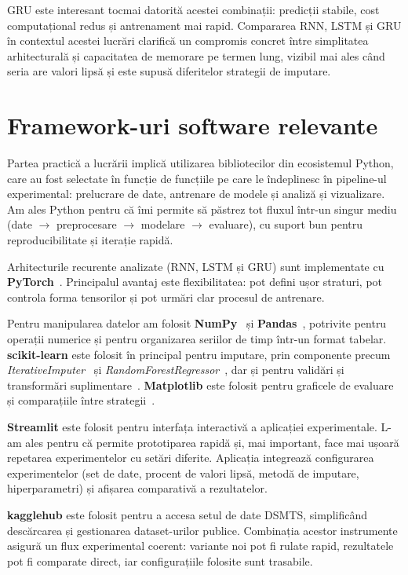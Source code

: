 GRU este interesant tocmai datorită acestei combinații: predicții stabile, cost computațional redus și antrenament mai rapid. Compararea RNN, LSTM și GRU în contextul acestei lucrări clarifică un compromis concret între simplitatea arhitecturală și capacitatea de memorare pe termen lung, vizibil mai ales când seria are valori lipsă și este supusă diferitelor strategii de imputare.

\newpage
\section{Framework-uri software relevante}

Partea practică a lucrării implică utilizarea bibliotecilor din ecosistemul Python, care au fost selectate în funcție de funcțiile pe care le îndeplinesc în pipeline-ul experimental: prelucrare de date, antrenare de modele și analiză și vizualizare. Am ales Python pentru că îmi permite să păstrez tot fluxul într-un singur mediu (date $\rightarrow$ preprocesare $\rightarrow$ modelare $\rightarrow$ evaluare), cu suport bun pentru reproducibilitate și iterație rapidă.

Arhitecturile recurente analizate (RNN, LSTM și GRU) sunt implementate cu \textbf{PyTorch}~\cite{paszke2019pytorch}. Principalul avantaj este flexibilitatea: pot defini ușor straturi, pot controla forma tensorilor și pot urmări clar procesul de antrenare.

Pentru manipularea datelor am folosit \textbf{NumPy}~\cite{harris2020numpy} și \textbf{Pandas}~\cite{mckinney2010pandas}, potrivite pentru operații numerice și pentru organizarea seriilor de timp într-un format tabelar. \textbf{scikit-learn} este folosit în principal pentru imputare, prin componente precum \textit{IterativeImputer}~\cite{buuren2011mice} și \textit{RandomForestRegressor}~\cite{breiman2001rf}, dar și pentru validări și transformări suplimentare~\cite{pedregosa2011sklearn}. \textbf{Matplotlib} este folosit pentru graficele de evaluare și comparațiile între strategii~\cite{hunter2007matplotlib}.

\textbf{Streamlit} este folosit pentru interfața interactivă a aplicației experimentale. L-am ales pentru că permite prototiparea rapidă și, mai important, face mai ușoară repetarea experimentelor cu setări diferite. Aplicația integrează configurarea experimentelor (set de date, procent de valori lipsă, metodă de imputare, hiperparametri) și afișarea comparativă a rezultatelor.

\textbf{kagglehub} este folosit pentru a accesa setul de date DSMTS, simplificând descărcarea și gestionarea dataset-urilor publice. Combinația acestor instrumente asigură un flux experimental coerent: variante noi pot fi rulate rapid, rezultatele pot fi comparate direct, iar configurațiile folosite sunt trasabile.